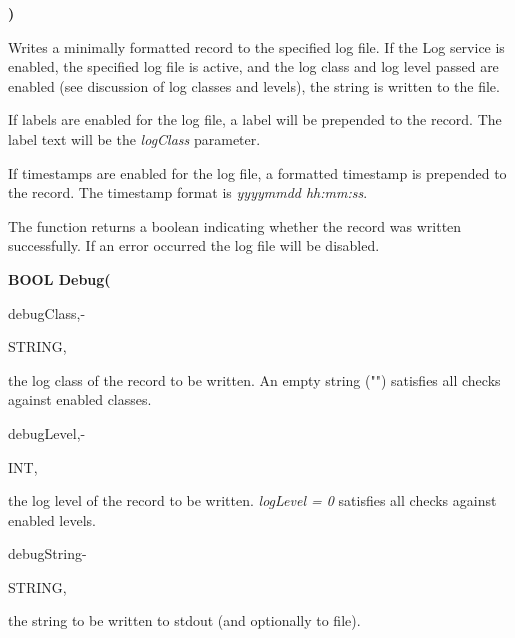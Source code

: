 \textbf{)}

\medskip 
Writes a minimally formatted record to the specified log file.  If the Log service is enabled, the specified log file is active, and the log class and log level passed are enabled (see discussion of log classes and levels), the string is written to the file.  

If labels are enabled for the log file, a label will be prepended to the record.  The label text will be the \textit{logClass} parameter.

If timestamps are enabled for the log file, a formatted timestamp is prepended to the record. The timestamp format is \textit{yyyymmdd hh:mm:ss}.

The function returns a boolean indicating whether the record was written successfully. If an error occurred the log file will be disabled.

\bigskip
\textbf{BOOL Debug(}

\hfill
\begin{minipage}{\dimexpr\textwidth-2em}

        \medskip
        \begin{minipage}[t][][b]{9.5em}debugClass,\hfill{-}\end{minipage}
        \begin{minipage}[t][][b]{5.5em}STRING,\hfill\end{minipage}
        \begin{minipage}[t][][b]{\dimexpr\textwidth-15.5em}
            the log class of the record to be written. An empty string ("") satisfies all checks against enabled classes.
        \end{minipage}\vfill

        \medskip
        \begin{minipage}[t][][b]{9.5em}debugLevel,\hfill{-}\end{minipage}
        \begin{minipage}[t][][b]{5.5em}INT,\hfill\end{minipage}
        \begin{minipage}[t][][b]{\dimexpr\textwidth-15.5em}
            the log level of the record to be written. \textit{logLevel = 0} satisfies all checks against enabled levels.
        \end{minipage}\vfill

        \medskip
        \begin{minipage}[t][][b]{9.5em}debugString\hfill{-}\end{minipage}
        \begin{minipage}[t][][b]{5.5em}STRING,\hfill\end{minipage}
        \begin{minipage}[t][][b]{\dimexpr\textwidth-15.5em}
            the string to be written to stdout (and optionally to file).
        \end{minipage}\vfill
\end{minipage}

